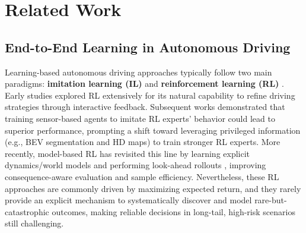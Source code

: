 \documentclass[twocolumn]{template}
\theoremstyle{thmstyleone}%
\theoremstyle{thmstyletwo}%
\theoremstyle{thmstylethree}%
\begin{document}
\section{Related Work}

\subsection{End-to-End Learning in Autonomous Driving}

Learning-based autonomous driving approaches typically follow two main paradigms: \textbf{imitation learning (IL)} and \textbf{reinforcement learning (RL)} \cite{Survey1,Survey2}. 
Early studies explored RL extensively \cite{MaRLn,WoR,GRIAD,RL1,RL2,RL3,SPC,IPC,RL5,RL6} for its natural capability to refine driving strategies through interactive feedback. 
Subsequent works \cite{Roach,Think2drive} demonstrated that training sensor-based agents to imitate RL experts' behavior could lead to superior performance, prompting a shift toward leveraging privileged information (e.g., BEV segmentation and HD maps) to train stronger RL experts.
More recently, model-based RL has revisited this line by learning explicit dynamics/world models and performing look-ahead rollouts \cite{Raw2Drive}, improving consequence-aware evaluation and sample efficiency. 
Nevertheless, these RL approaches are commonly driven by maximizing expected return, and they rarely provide an explicit mechanism to systematically discover and model rare-but-catastrophic outcomes, making reliable decisions in long-tail, high-risk scenarios still challenging.
\end{document}
